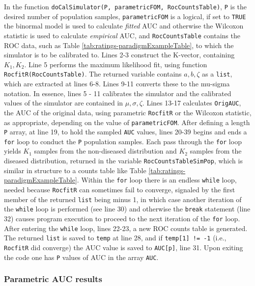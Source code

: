 \documentclass[
]{book}
\begin{document}
In the function \texttt{doCalSimulator(P,\ parametricFOM,\ RocCountsTable)}, \texttt{P} is the desired number of population samples, \texttt{parametricFOM} is a logical, if set to \texttt{TRUE} the binormal model is used to calculate \emph{fitted} AUC and otherwise the Wilcoxon statistic is used to calculate \emph{empirical} AUC, and \texttt{RocCountsTable} contains the ROC data, such as Table \ref{tab:ratings-paradigmExampleTable}, to which the simulator is to be calibrated to. Lines 2-3 construct the K-vector, containing \(K_1,K_2\). Line 5 performs the maximum likelihood fit, using function \texttt{RocfitR(RocCountsTable)}. The returned variable contains \(a, b, \zeta\) as a \texttt{list}, which are extracted at lines 6-8. Lines 9-11 converts these to the mu-sigma notation. In essence, lines 5 - 11 calibrates the simulator and the calibrated values of the simulator are contained in \(\mu,\sigma,\zeta\). Lines 13-17 calculates \texttt{OrigAUC}, the AUC of the original data, using parametric \texttt{RocfitR} or the Wilcoxon statistic, as appropriate, depending on the value of \texttt{parametricFOM}. After defining a length \texttt{P} array, at line 19, to hold the sampled \texttt{AUC} values, lines 20-39 begins and ends a \texttt{for} loop to conduct the \texttt{P} population samples. Each pass through the \texttt{for} loop yields \(K_1\) samples from the non-diseased distribution and \(K_2\) samples from the diseased distribution, returned in the variable \texttt{RocCountsTableSimPop}, which is similar in structure to a counts table like Table \ref{tab:ratings-paradigmExampleTable}. Within the \texttt{for} loop there is an endless \texttt{while} loop, needed because \texttt{RocfitR} can sometimes fail to converge, signaled by the first member of the returned \texttt{list} being minus 1, in which case another iteration of the \texttt{while} loop is performed (see line 30) and otherwise the \texttt{break} statement (line 32) causes program execution to proceed to the next iteration of the \texttt{for} loop. After entering the \texttt{while} loop, lines 22-23, a new ROC counts table is generated. The returned \texttt{list} is saved to \texttt{temp} at line 28, and if \texttt{temp{[}1{]}\ !=\ -1} (i.e., \texttt{RocfitR} did converge) the AUC value is saved to \texttt{AUC{[}p{]}}, line 31. Upon exiting the code one has \texttt{P} values of AUC in the array \texttt{AUC}.

\hypertarget{parametric-auc-results}{%
\subsubsection{Parametric AUC results}\label{parametric-auc-results}}
\end{document}
